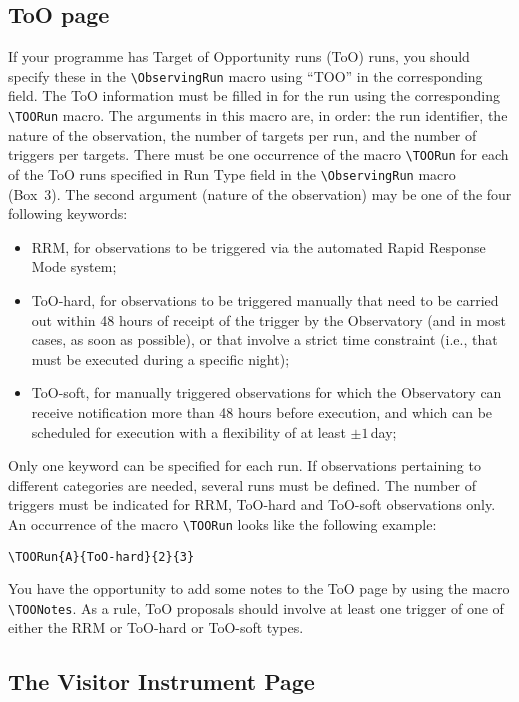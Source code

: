 \documentclass{article}
\begin{document}
\subsection{ToO page}
\label{sec:toopage}

If your programme has Target of Opportunity runs (ToO) runs,
you should specify these in the  \verb|\ObservingRun| macro
using ``TOO'' in the corresponding field.
The ToO information must be filled in for the run
using the corresponding
\verb|\TOORun| macro.  The arguments in this macro
are, in order: the run identifier,
the nature of the observation, the number of
targets per run, and the number of triggers per targets. There must be
one occurrence of the macro \verb|\TOORun| for each of the ToO runs specified
in Run Type field in  the \verb|\ObservingRun| macro (Box~3).
 The second argument (nature of the observation) may be one
of the four following keywords:
\begin{itemize}
\item RRM, for observations to be triggered via the automated Rapid
  Response Mode system;
\item ToO-hard, for observations to be triggered manually that need to
  be carried out within 48 hours of receipt of the trigger by the
  Observatory (and in most cases, as soon as possible), or that
  involve a strict time constraint (i.e., that must be executed during
  a specific night);
\item ToO-soft, for manually triggered observations for which the
  Observatory can receive notification more than 48 hours before
  execution, and which can be scheduled for execution with a
  flexibility of at least $\pm1$\,day;
\end{itemize}
Only one keyword can be specified for each run. If observations
pertaining to different categories are needed,
several runs must be defined. The number of triggers must be indicated
for RRM, ToO-hard and ToO-soft observations only.
An occurrence of the macro \verb|\TOORun|
looks like the following example:
\begin{verbatim}
\TOORun{A}{ToO-hard}{2}{3}
\end{verbatim}

You have the opportunity to add some notes to the ToO page by using
the macro \verb|\TOONotes|.
As a rule, ToO proposals should involve at least one trigger
of one of either the RRM or ToO-hard or ToO-soft types.


\subsection{The Visitor Instrument Page}
\label{sec:visins}
\end{document}
